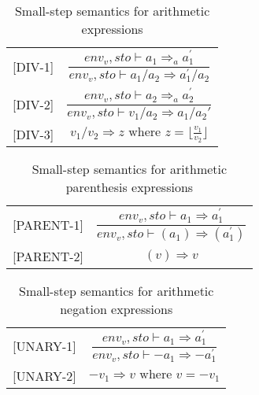 \begin{table}[H]
    \centering
    \begin{longtable}[c] { r c }
        
        [DIV-1] & \( \dfrac{ env_v,sto \vdash a_1 \Rightarrow_a a^{'}_{1}}{env_v,sto \vdash a_1 / a_2 \Rightarrow a^{'}_{1} / a_2} \) \\
        
        [DIV-2] & \( \dfrac{ env_v,sto \vdash a_2 \Rightarrow_a a^{'}_{2}}{env_v,sto \vdash v_1 / a_2 \Rightarrow a_{1} / a_2{'}} \) \\
        
        
        [DIV-3] & \(v_1 / v_2 \Rightarrow z \text{ where } z = \lfloor\frac{v_1}{v_2}\rfloor\) \\
        
    \end{longtable}
    \caption{Small-step semantics for arithmetic expressions}\label{tab:sss_aud}
\end{table}
        \begin{table}[H]
    \centering
    \begin{longtable}[c] { r c }
        [PARENT-1] & \( \dfrac{env_v,sto \vdash a_1 \Rightarrow a^{'}_{1}}{env_v,sto \vdash (a_1) \Rightarrow (a^{'}_{1})} \) \\
        
        [PARENT-2] & \( (v) \Rightarrow v \) \\
        
    \end{longtable}
    \caption{Small-step semantics for arithmetic parenthesis expressions}\label{tab:sss_aud}
\end{table}
\begin{table}[H]
    \centering
    \begin{longtable}[c] { r c }
        
        [UNARY-1] & \( \dfrac{env_v,sto \vdash a_1 \Rightarrow a^{'}_{1}}{env_v,sto \vdash -a_1 \Rightarrow -a^{'}_{1}} \) \\
        
        [UNARY-2] & \( -v_1 \Rightarrow v \text{ where } v = -v_1 \)\\
        
    \end{longtable}
    \caption{Small-step semantics for arithmetic negation expressions}\label{tab:sss_aud}
\end{table}

\iffalse
Don't think we need intger only when we got Num and var??
\begin{table}[H]
    \centering
    \begin{longtable}[c] { r c }
        
        [INT-1] & \( n \Rightarrow z \text{ if } \mathbb{Z}[[n]] = z \) \\
        
        [INT-2] & \( v \Rightarrow z \text{ if } v \in \mathbb{Z} \)\\
        
    \end{longtable}
    \caption{Small-step semantics for arithmetic integer expressions}\label{tab:sss_aud}
\end{table}
\fi

